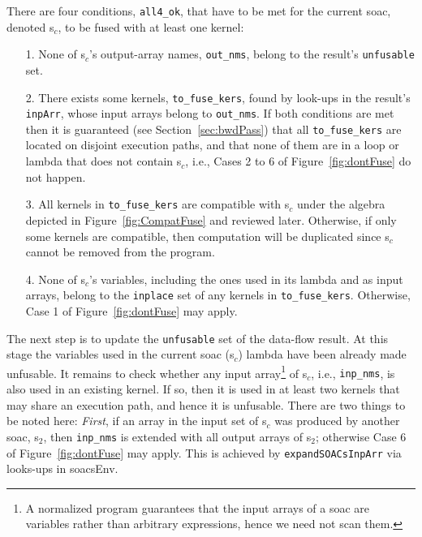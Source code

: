 \documentclass{sigplanconf}  %
\newcommand{\emp}[1]{\textcolor{DikuRed}{ #1}}
\newcommand{\emphh}[1]{\textcolor{CosGreen}{ #1}}
\begin{document}
There are four conditions, {\tt all4\_ok}, that have to be met for the 
current {\sc soac}, denoted {\sc s}$_c$, to be fused with at least one kernel: %
\begin{itemize}
    \item [1.] None of {\sc s}$_c$'s output-array names, {\tt out\_nms}, 
                belong to the result's {\tt unfusable} set.
    \item [2.] There exists some kernels, {\tt to\_fuse\_kers}, found by look-ups
                in the result's {\tt inpArr}, whose input arrays belong to {\tt out\_nms}.
                If both conditions are met then it is guaranteed (see Section~\ref{sec:bwdPass}) 
                that all {\tt to\_fuse\_kers} are located on disjoint execution paths,
                and that none of them are in a loop or lambda 
                that does not contain {\sc s}$_c$, 
                i.e., \emp{Cases 2 to 6} of Figure~\ref{fig:dontFuse} do not happen.
    \item [3.] All kernels in {\tt to\_fuse\_kers} are compatible with 
                    {\sc s}$_c$ under the algebra depicted 
                    in Figure~\ref{fig:CompatFuse} and reviewed later. 
               Otherwise, if only some kernels are compatible, then computation
                will be duplicated since {\sc s}$_c$ cannot be removed
                from the program.
    \item [4.] None of {\sc s}$_c$'s variables, including the
                ones used in its lambda and as input arrays, belong to the 
                {\tt inplace} set of any kernels in {\tt to\_fuse\_kers}.
                Otherwise, \emp{Case 1} of Figure~\ref{fig:dontFuse} may apply.
\end{itemize}

The next step is to update the {\tt unfusable} set of the data-flow result.
At this stage the variables used in the current {\sc soac} ({\sc s}$_c$) lambda
have been already made unfusable. It remains to check whether any input
array\footnote{
A normalized program guarantees that the input arrays of a {\sc soac}
are variables rather than arbitrary expressions, hence we need not scan them.
} of {\sc s}$_c$, i.e., {\tt inp\_nms}, is also used in an 
existing kernel. If so, then it is used in at least two kernels that may
share an execution path, and hence it is unfusable. There are two things 
to be noted here:
{\em First}, if an array in the input set of {\sc s}$_c$
was produced by another {\sc soac}, {\sc s}$_2$, then {\tt inp\_nms} is
extended with all output arrays of {\sc s}$_2$; otherwise \emp{Case 6} 
of Figure~\ref{fig:dontFuse} may apply. This is achieved by
{\tt expandSOACsInpArr} via looks-ups in \emphh{soacsEnv}. 
\end{document}
